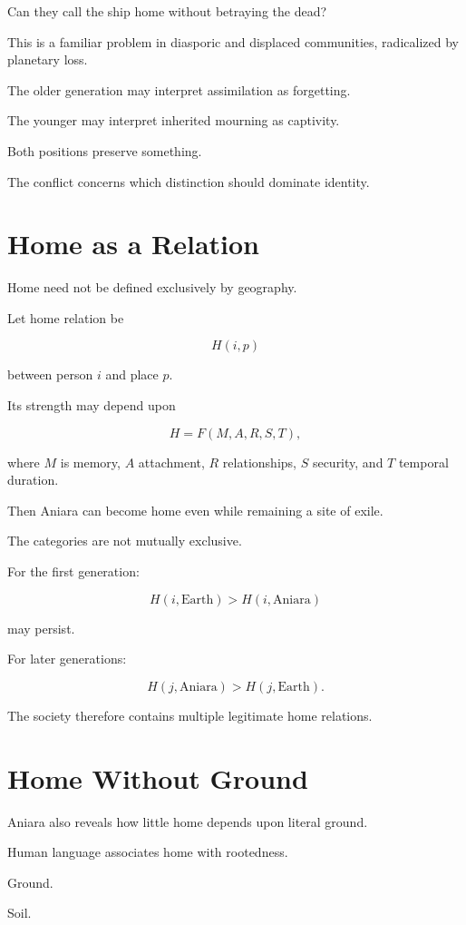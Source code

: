 \documentclass[11pt,oneside]{book}
\theoremstyle{definition}
\theoremstyle{remark}
\begin{document}
Can they call the ship home without betraying the dead?

This is a familiar problem in diasporic and displaced communities, radicalized by planetary loss.

The older generation may interpret assimilation as forgetting.

The younger may interpret inherited mourning as captivity.

Both positions preserve something.

The conflict concerns which distinction should dominate identity.

\section{Home as a Relation}

Home need not be defined exclusively by geography.

Let home relation be

\[
H(i,p)
\]

between person \(i\) and place \(p\).

Its strength may depend upon

\[
H
=
F(M,A,R,S,T),
\]

where \(M\) is memory, \(A\) attachment, \(R\) relationships, \(S\) security, and \(T\) temporal duration.

Then Aniara can become home even while remaining a site of exile.

The categories are not mutually exclusive.

For the first generation:

\[
H(i,\text{Earth})
>
H(i,\text{Aniara})
\]

may persist.

For later generations:

\[
H(j,\text{Aniara})
>
H(j,\text{Earth}).
\]

The society therefore contains multiple legitimate home relations.

\section{Home Without Ground}

Aniara also reveals how little home depends upon literal ground.

Human language associates home with rootedness.

Ground.

Soil.
\end{document}
